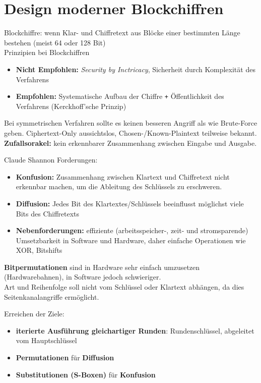 \chapter{Design moderner Blockchiffren}
Blockchiffre: wenn Klar- und Chiffretext aus Blöcke einer bestimmten Länge bestehen (meist 64 oder 128 Bit) \\
Prinzipien bei Blockchiffren
\begin{itemize}
	\item \textbf{Nicht Empfohlen:} \textit{Security by Inctricacy}, Sicherheit durch Komplexität des Verfahrens
	\item \textbf{Empfohlen:} Systematische Aufbau der Chiffre \texttt{+} Öffentlichkeit des Verfahrens (Kerckhoff'sche Prinzip)
\end{itemize}

Bei symmetrischen Verfahren sollte es keinen besseren Angriff als wie Brute-Force geben. Ciphertext-Only aussichtslos, Chosen-/Known-Plaintext teilweise bekannt. \\
\textbf{Zufallsorakel:} kein erkennbarer Zusammenhang zwischen Eingabe und Ausgabe.

Claude Shannon Forderungen:
\begin{itemize}
	\item \textbf{Konfusion:} Zusammenhang zwischen Klartext und Chiffretext nicht erkennbar machen, um die Ableitung des Schlüssels zu erschweren.
	\item \textbf{Diffusion:} Jedes Bit des Klartextes/Schlüssels beeinflusst möglichst viele Bits des Chiffretexts
	\item \textbf{Nebenforderungen:} effiziente (arbeitsspeicher-, zeit- und stromsparende) Umsetzbarkeit in Software und Hardware, daher einfache Operationen wie XOR, Bitshifts
\end{itemize}

\textbf{Bitpermutationen} sind in Hardware sehr einfach umzusetzen (Hardwarebahnen), in Software jedoch schwieriger. \\
Art und Reihenfolge soll nicht vom Schlüssel oder Klartext abhängen, da dies Seitenkanalangriffe ermöglicht.

Erreichen der Ziele:
\begin{itemize}
	\item \textbf{iterierte Ausführung gleichartiger Runden}: Rundenschlüssel, abgeleitet vom Hauptschlüssel
	\item \textbf{Permutationen} für \textbf{Diffusion}
	\item \textbf{Substitutionen (S-Boxen)} für \textbf{Konfusion}
\end{itemize}

